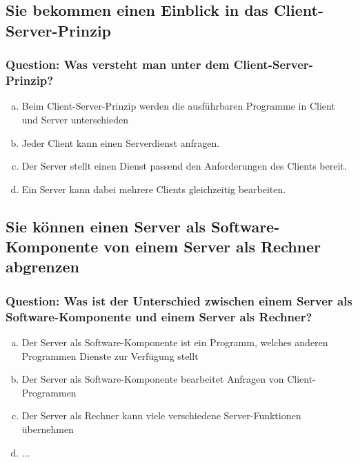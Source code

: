 \documentclass{article}
\begin{document}
\begin{adjustwidth}{2em}{2em}
\begin{adjustwidth}{2em}{2em}
			\subsection{Sie bekommen einen Einblick in das Client-Server-Prinzip}
			\begin{adjustwidth}{1em}{}
				\subsubsection*{Question: Was versteht man unter dem Client-Server-Prinzip?}
				\begin{adjustwidth}{1em}{}
					\begin{enumerate}[(a)]
						\item Beim Client-Server-Prinzip werden die ausführbaren Programme in Client und Server unterschieden
						\item Jeder Client kann einen Serverdienst anfragen.
						\item Der Server stellt einen Dienst passend den Anforderungen des Clients bereit.
						\item Ein Server kann dabei mehrere Clients gleichzeitig bearbeiten.
					\end{enumerate}
				\end{adjustwidth}
			\end{adjustwidth}
			\subsection{Sie können einen Server als Software-Komponente von einem Server als Rechner abgrenzen}
			\begin{adjustwidth}{1em}{}
				\subsubsection*{Question: Was ist der Unterschied zwischen einem Server als Software-Komponente und einem Server als Rechner?}
				\begin{adjustwidth}{1em}{}
					\begin{enumerate}[(a)]
						\item Der Server als Software-Komponente ist ein Programm, welches anderen Programmen Dienste zur Verfügung stellt
						\item Der Server als Software-Komponente bearbeitet Anfragen von Client-Programmen
						\item Der Server als Rechner kann viele verschiedene Server-Funktionen übernehmen
						\item ...
					\end{enumerate}
				\end{adjustwidth}
			\end{adjustwidth}

\end{adjustwidth}
\end{adjustwidth}
\end{document}
